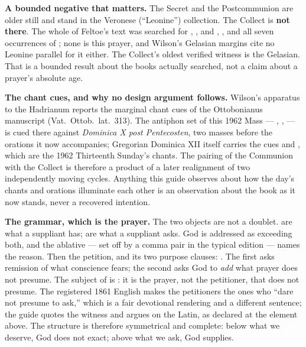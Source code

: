 \textbf{A bounded negative that matters.} The Secret and the Postcommunion are
older still and stand in the Veronese (``Leonine'') collection. The Collect is
\textbf{not there}. The whole of Feltoe's text was searched for
, ,  and
, , and all seven occurrences of
; none is this prayer, and Wilson's Gelasian margins cite no
Leonine parallel for it either. The Collect's oldest verified witness is the
Gelasian. That is a bounded result about the books actually searched, not a
claim about a prayer's absolute age.

\textbf{The chant cues, and why no design argument follows.} Wilson's apparatus
to the Hadrianum reports the marginal chant cues of the Ottobonianus manuscript
(Vat.~Ottob.~lat.~313). The antiphon set of this 1962 Mass --- , ,  --- is
cued there against \textit{Dominica X post Pentecosten}, two masses before the
orations it now accompanies; Gregorian Dominica XII itself carries the cues
 and , which are the
1962 Thirteenth Sunday's chants. The pairing of the 
Communion with the  Collect is therefore a product
of a later realignment of two independently moving cycles. Anything this guide
observes about how the day's chants and orations illuminate each other is an
observation about the book as it now stands, never a recovered intention.

\textbf{The grammar, which is the prayer.}  The two
objects are not a doublet.  are what a suppliant has;
 are what a suppliant asks. God is addressed as exceeding both, and
the ablative  --- set off by a comma pair in the
typical edition --- names the reason. Then the petition, and its two purpose
clauses: . The first asks remission of what conscience fears; the second asks
God to \textit{add} what prayer does not presume. The subject of
 is : it is the prayer, not the petitioner, that
does not presume. The registered 1861 English makes the petitioners the ones
who ``dare not presume to ask,'' which is a fair devotional rendering and a
different sentence; the guide quotes the witness and argues on the Latin, as
declared at the element above. The structure is therefore symmetrical and
complete: below what we deserve, God does not exact; above what we ask, God
supplies.

